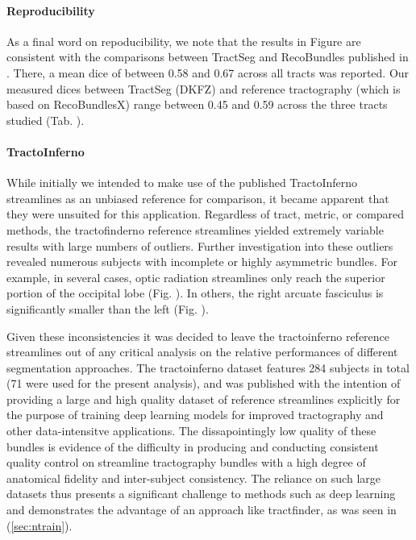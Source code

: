 \paragraph*{Reproducibility}

As a final word on repoducibility, we note that the results in Figure  are consistent with the comparisons between TractSeg and RecoBundles published in \textcite{Wasserthal2018}.
There, a mean \gls{dice} of between 0.58 and 0.67 across all tracts was reported.
Our measured \gls{dice}s between TractSeg (DKFZ) and reference tractography (which is based on RecoBundlesX\autocite{Garyfallidis2018}) range between 0.45 and 0.59 across the three tracts studied (Tab. ).

\paragraph*{TractoInferno}


While initially we intended to make use of the published TractoInferno streamlines as an unbiased reference for comparison, it became apparent that they were unsuited for this application.
Regardless of tract, metric, or compared methods, the tractofinderno reference streamlines yielded extremely variable results with large numbers of outliers.
Further investigation into these outliers revealed numerous subjects with incomplete or highly asymmetric bundles.
For example, in several cases, optic radiation streamlines only reach the superior portion of the occipital lobe (Fig. ).
In others, the right arcuate fasciculus is significantly smaller than the left (Fig. ).

Given these inconsistencies it was decided to leave the tractoinferno reference streamlines out of any critical analysis on the relative performances of different segmentation approaches.
The tractoinferno dataset features 284 subjects in total (71 were used for the present analysis), and was published with the intention of providing a large and high quality dataset of reference streamlines explicitly for the purpose of training deep learning models for improved tractography and other data-intensitve applications.
The dissapointingly low quality of these bundles is evidence of the difficulty in producing and conducting consistent quality control on streamline tractography bundles with a high degree of anatomical fidelity and inter-subject consistency.
The reliance on such large datasets thus presents a significant challenge to methods such as deep learning and demonstrates the advantage of an approach like tractfinder, as was seen in (\ref{sec:ntrain}).

